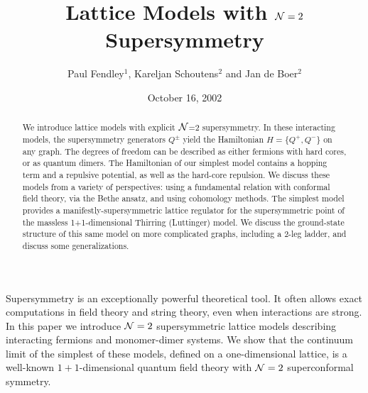 \documentclass[a4paper,prl,aps,twocolumn]{revtex4}
\begin{document}
  
%  
%  
%  
%  
\title{Lattice Models with ${\cal N}=2$ Supersymmetry}
  
\author{
Paul Fendley$^1$, Kareljan Schoutens$^2$ and Jan de Boer$^2$ 
\medskip}  
  
\begin{abstract}  
\smallskip  
We introduce lattice models with explicit ${\cal N}$=2 supersymmetry.
In these interacting models, the
supersymmetry generators $Q^\pm$ yield the Hamiltonian $H=
\{Q^+,Q^-\}$ on any graph. The degrees of freedom can be described as
either fermions with hard cores, or as quantum dimers. The Hamiltonian
of our simplest model contains a hopping term and a repulsive
potential, as well as the hard-core repulsion. We discuss these models
from a variety of perspectives: using a fundamental relation with
conformal field theory, via the Bethe ansatz, and using cohomology 
methods. The simplest model provides a 
manifestly-supersymmetric lattice regulator for the supersymmetric point
of the massless 1+1-dimensional Thirring (Luttinger) model. We
discuss the ground-state structure of this same model on more
complicated graphs, including a 2-leg ladder, and discuss some
generalizations.
  
\end{abstract}  
  
  
\date{October 16, 2002}  
  
\maketitle  
  
Supersymmetry is an exceptionally powerful theoretical tool. It often
allows exact computations in field theory and string theory, even when
interactions are strong. In this paper we introduce ${\cal N}=2$
supersymmetric lattice models describing interacting fermions and
monomer-dimer systems. We show that the continuum limit
of the simplest of these models, defined on a one-dimensional lattice,
is a well-known $1+1$-dimensional quantum field theory with ${\cal N}=2$
superconformal symmetry.
  
\end{document}
